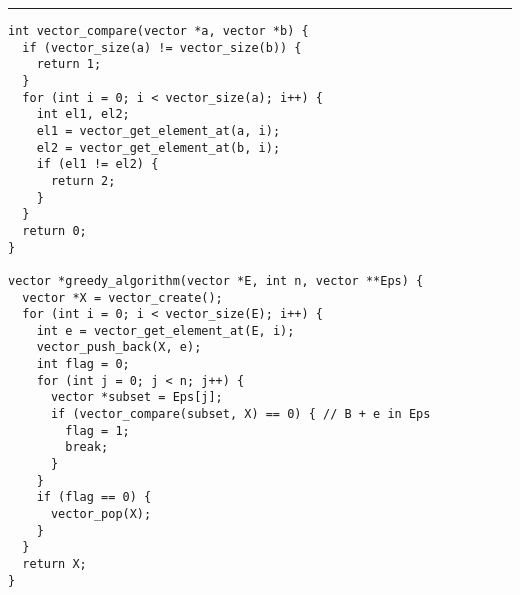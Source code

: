 \documentclass{article}
\begin{document}
\lstset{language = C,
    extendedchars = \true,
    keepspaces = true,
    breaklines=true,
    frame=lines}
\hrule
\begin{lstlisting}[title=\textbf {Алгоритм 2.1} Построение базиса матроида]
int vector_compare(vector *a, vector *b) {
  if (vector_size(a) != vector_size(b)) {
    return 1;
  }
  for (int i = 0; i < vector_size(a); i++) {
    int el1, el2;
    el1 = vector_get_element_at(a, i);
    el2 = vector_get_element_at(b, i);
    if (el1 != el2) {
      return 2;
    }
  }
  return 0;
}

vector *greedy_algorithm(vector *E, int n, vector **Eps) {
  vector *X = vector_create();
  for (int i = 0; i < vector_size(E); i++) {
    int e = vector_get_element_at(E, i);
    vector_push_back(X, e);
    int flag = 0;
    for (int j = 0; j < n; j++) {
      vector *subset = Eps[j];
      if (vector_compare(subset, X) == 0) { // B + e in Eps
        flag = 1;
        break;
      }
    }
    if (flag == 0) {
      vector_pop(X);
    }
  }
  return X;
}
\end{lstlisting}
\end{document}
